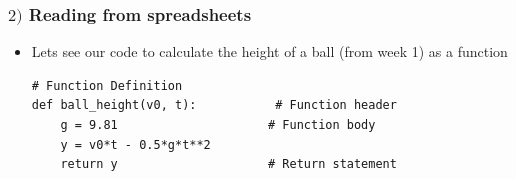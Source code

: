 \documentclass[english,14pt]{beamer}
\begin{document}
\begin{frame}[fragile]

\frametitle{$2)$ Reading from spreadsheets}

\begin{itemize}
\item Lets see our code to calculate the height of a ball (from week 1) as a function
\begin{lstlisting}[style=CStyle]
# Function Definition
def ball_height(v0, t):           # Function header
    g = 9.81                     # Function body
    y = v0*t - 0.5*g*t**2
    return y                     # Return statement
\end{lstlisting}
\end{itemize}

\end{frame}
\end{document}
